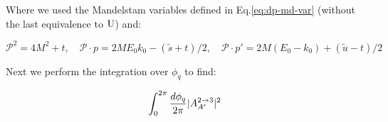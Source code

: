 Where we used the Mandelstam variables defined in Eq.\ref{eq:dp-md-var} (without the last equivalence to $\rm{U}$) and:

\begin{equation}
  \label{eq:dp-md-var-2}
  \mathcal{P}^2 = 4M^2 + t, \quad \mathcal{P} \cdot p = 2 M E_0 k_0 - (\widetilde{s} + t)/2, \quad \mathcal{P} \cdot p' = 2 M (E_0 - k_0) + (\widetilde{u} - t)/2
\end{equation}

Next we perform the integration over $\phi_q$ to find:

\begin{equation}
  \label{eq:dp-cs-tl-int}
  \int_0^{2\pi} \frac{d\phi_q}{2\pi} |A^{2 \to 3}_{A'}|^2
\end{equation}










